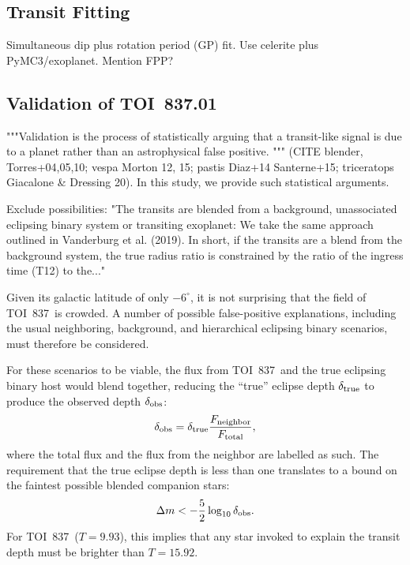\documentclass[12pt,twocolumn,tighten]{aastex62}
\newcommand{\tn}{TOI~837} %
\newcommand{\pn}{TOI~837.01} %
\begin{document}
\subsection{Transit Fitting}
Simultaneous dip plus rotation period (GP) fit. Use celerite plus PyMC3/exoplanet.
Mention FPP?


\subsection{Validation of \pn}
\label{subsec:validation}

"""Validation is the process of statistically arguing that a
transit-like signal is due to a planet rather than an astrophysical
false positive. """
(CITE blender, Torres+04,05,10; vespa Morton 12, 15; pastis Diaz+14
Santerne+15; triceratops Giacalone \& Dressing 20).
In this study, we provide such statistical arguments.


Exclude possibilities:
"The transits are blended from a background, unassociated eclipsing binary
system or transiting exoplanet: We take the same approach outlined in
Vanderburg et al. (2019). In short, if the transits are a blend from the
background system, the true radius ratio is constrained by the ratio of the
ingress time (T12) to the..."


Given its galactic latitude of only $-6^\circ$, it is not surprising
that the field of \tn\ is crowded.
A number of possible false-positive explanations, including
the usual neighboring, background, and hierarchical eclipsing binary
scenarios, must therefore be considered.

For these scenarios to be viable, the flux from \tn\ and the true
eclipsing binary host would blend together, reducing the ``true''
eclipse depth $\delta_{\rm true}$ to produce the observed depth
$\delta_{\rm obs}$:
\begin{equation}
  \delta_{\rm obs}
  = 
  \delta_{\rm true} \frac{F_{\rm neighbor}}{F_{\rm total}},
\end{equation}
where the total flux and the flux from the neighbor are labelled as
such.
The requirement that the true eclipse depth is less than one
translates to a bound on the faintest possible blended companion
stars:
\begin{equation}
    \Delta m < - \frac{5}{2} \log_{10} \delta_{\rm obs}.
\end{equation}
For \tn\ ($T=9.93$), this implies that any star invoked to explain the
transit depth must be brighter than $T=15.92$.
\end{document}
